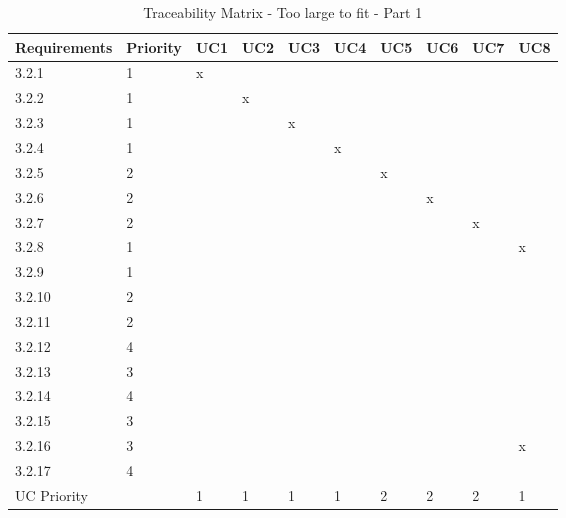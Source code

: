 \documentclass[runningheads,a4paper]{article}
\begin{document}
\begin{table}[H]
\centering

\label{my-label}
\begin{tabular}{|l|l|l|l|l|l|l|l|l|l|}
\hline
Requirements & Priority & UC1 & UC2 & UC3 & UC4 & UC5 & UC6 & UC7 & UC8 \\ \hline
3.2.1 & 1 & x &  &  &  &  &  &  &  \\ \hline
3.2.2 & 1 &  & x &  &  &  &  &  &  \\ \hline
3.2.3 & 1 &  &  & x &  &  &  &  &  \\ \hline
3.2.4 & 1 &  &  &  & x &  &  &  &  \\ \hline
3.2.5 & 2 &  &  &  &  & x &  &  &  \\ \hline
3.2.6 & 2 &  &  &  &  &  & x &  &  \\ \hline
3.2.7 & 2 &  &  &  &  &  &  & x &  \\ \hline
3.2.8 & 1 &  &  &  &  &  &  &  & x \\ \hline
3.2.9 & 1 &  &  &  &  &  &  &  &  \\ \hline
3.2.10 & 2 &  &  &  &  &  &  &  &  \\ \hline
3.2.11 & 2 &  &  &  &  &  &  &  &  \\ \hline
3.2.12 & 4 &  &  &  &  &  &  &  &  \\ \hline
3.2.13 & 3 &  &  &  &  &  &  &  &  \\ \hline
3.2.14 & 4 &  &  &  &  &  &  &  &  \\ \hline
3.2.15 & 3 &  &  &  &  &  &  &  &  \\ \hline
3.2.16 & 3 &  &  &  &  &  &  &  & x \\ \hline
3.2.17 & 4 &  &  &  &  &  &  &  &  \\ \hline
\multicolumn{2}{|l|}{UC Priority} & 1 & 1 & 1 & 1 & 2 & 2 & 2 & 1 \\ \hline
\end{tabular}
\caption{Traceability Matrix - Too large to fit - Part 1}
\end{table}
\end{document}

